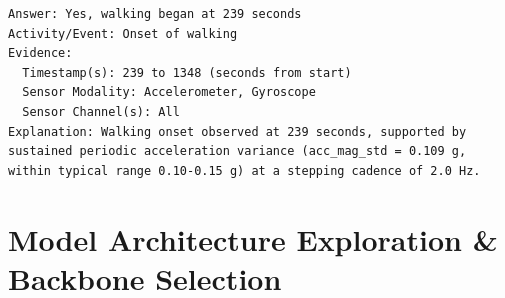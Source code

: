 \documentclass[11pt,a4paper]{article}
\begin{document}
\begin{lstlisting}
Answer: Yes, walking began at 239 seconds
Activity/Event: Onset of walking
Evidence:
  Timestamp(s): 239 to 1348 (seconds from start)
  Sensor Modality: Accelerometer, Gyroscope
  Sensor Channel(s): All
Explanation: Walking onset observed at 239 seconds, supported by sustained periodic acceleration variance (acc_mag_std = 0.109 g, within typical range 0.10-0.15 g) at a stepping cadence of 2.0 Hz.
\end{lstlisting}

\section{Model Architecture Exploration \& Backbone Selection}
\label{sec:models}

\begin{table}[t]
\centering
\small
\caption{\textbf{Comprehensive Comparison Across Six Activity Recognition Backbones.} All models evaluated on the identical official 5-fold user-level split over 95,609 test minutes from ExtraSensory. Signal-consistent accuracy excludes active minutes where $\|\mathbf{a}\|\text{ std} < 0.03\text{ g}$. ($^*$HistGradientBoosting evaluated on 2 of 5 folds as an exploratory baseline).}
\label{tab:backbone_comparison}
\end{table}
\end{document}
